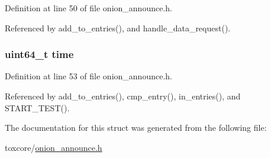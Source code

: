 Definition at line 50 of file onion\+\_\+announce.\+h.



Referenced by add\+\_\+to\+\_\+entries(), and handle\+\_\+data\+\_\+request().

\hypertarget{struct_onion___announce___entry_a5d34a8f2dfe25421b2b473a5fd37b0ed}{
\subsubsection[{time}]{\setlength{\rightskip}{0pt plus 5cm}uint64\+\_\+t time}}\label{struct_onion___announce___entry_a5d34a8f2dfe25421b2b473a5fd37b0ed}


Definition at line 53 of file onion\+\_\+announce.\+h.



Referenced by add\+\_\+to\+\_\+entries(), cmp\+\_\+entry(), in\+\_\+entries(), and S\+T\+A\+R\+T\+\_\+\+T\+E\+S\+T().



The documentation for this struct was generated from the following file\+:\begin{DoxyCompactItemize}
\item 
toxcore/\hyperlink{onion__announce_8h}{onion\+\_\+announce.\+h}\end{DoxyCompactItemize}
